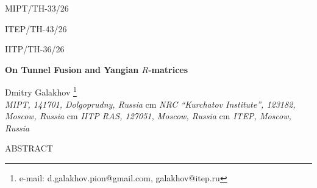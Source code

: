 \documentclass[10pt]{article}
\theoremstyle{definition}
\numberwithin{equation}{section}
\begin{document}
\hfill MIPT/TH-33/26

\hfill ITEP/TH-43/26

\hfill IITP/TH-36/26

\vskip 1.5in
\begin{center}
	
    {\bf\Large On Tunnel Fusion and Yangian $R$-matrices}
	
	\vskip 0.2in
	\renewcommand{\thefootnote}{\fnsymbol{footnote}}
	{Dmitry Galakhov%
		\footnote[2]{e-mail: d.galakhov.pion@gmail.com, galakhov@itep.ru}}\\
	
	\vskip 0.2in
	\renewcommand{\thefootnote}{\roman{footnote}}
	{\small{
			\textit{%
				MIPT, 141701, Dolgoprudny, Russia
			}
			 cm
			\textit{%
				NRC “Kurchatov Institute”, 123182, Moscow, Russia
			}
			 cm
			\textit{%
				IITP RAS, 127051, Moscow, Russia}
			 cm
			\textit{%
				ITEP, Moscow, Russia}
	}}
\end{center}

\vskip 0.2in
\baselineskip 16pt


\centerline{ABSTRACT}

\bigskip
\end{document}
